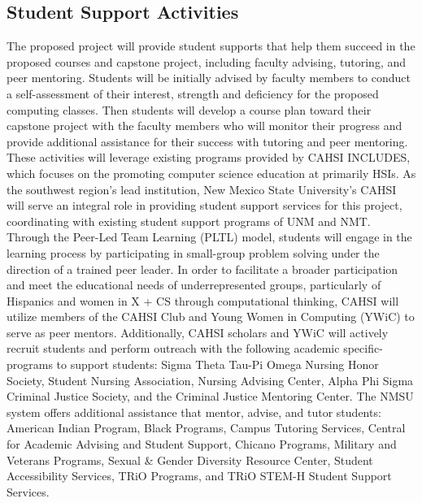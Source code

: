 
\subsection{Student Support Activities}

The proposed project will provide student supports that help them succeed in the proposed courses and capstone project, including faculty advising, tutoring, and peer mentoring. Students will be initially advised by faculty members to conduct a self-assessment of their interest, strength and deficiency for the proposed computing classes. Then students will develop a course plan toward their capstone project with the faculty members who will monitor their progress and provide additional assistance for their success with tutoring and peer mentoring. These activities will leverage existing programs provided by CAHSI INCLUDES, which focuses on the promoting computer science education at primarily HSIs.
As the southwest region’s lead institution, New Mexico State University's CAHSI will serve an integral role in providing student support services for this project, coordinating with existing student support programs of UNM and NMT. Through the Peer-Led Team Learning (PLTL) model, students will engage in the learning process by participating in small-group problem solving under the direction of a trained peer leader. In order to facilitate a broader participation and meet the educational needs of underrepresented groups, particularly of Hispanics and women in X + CS through computational thinking, CAHSI will utilize members of the CAHSI Club and Young Women in Computing (YWiC) to serve as peer mentors. Additionally, CAHSI scholars and YWiC will actively recruit students and perform outreach with the following academic specific-programs to support students: Sigma Theta Tau-Pi Omega Nursing Honor Society, Student Nursing Association, Nursing Advising Center, Alpha Phi Sigma Criminal Justice Society, and the Criminal Justice Mentoring Center. The NMSU system offers additional assistance that mentor, advise, and tutor students: American Indian Program, Black Programs, Campus Tutoring Services, Central for Academic Advising and Student Support, Chicano Programs, Military and Veterans Programs, Sexual \& Gender Diversity Resource Center, Student Accessibility Services, TRiO Programs, and TRiO STEM-H Student Support Services. 